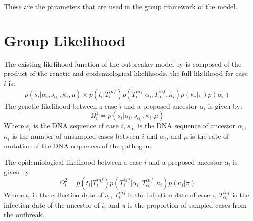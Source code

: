 \documentclass[11pt,a4paper]{report}
\begin{document}
These are the parameters that are used in the group framework of the model.

\section{Group Likelihood}
The existing likelihood function of the outbreaker model by \citet{outbrkr} is composed of the product of the genetic and epidemiological likelihoods, the full likelihood for case $i$ is:
\begin{equation}
p(s_i | \alpha_i , s_{\alpha_i}, \kappa_i, \mu) \times p(t_i | T^{inf}_i)p(T^{inf}_i | \alpha_i, T^{inf}_{\alpha_i}, \kappa_i)p(\kappa_i | \pi)p(\alpha_i)
\end{equation}
The genetic likelihood between a case $i$ and a proposed ancestor $\alpha_i$ is given by:
\begin{equation}
\Omega^{1}_i = p(s_i | \alpha_i , s_{\alpha_i}, \kappa_i, \mu)
\end{equation}
Where $s_i$ is the DNA sequence of case $i$, $s_{\alpha_i}$ is the DNA sequence of ancestor $\alpha_i$, $\kappa_i$ is the number of unsampled cases between $i$ and $\alpha_i$, and $\mu$ is the rate of mutation of the DNA sequences of the pathogen.

The epidemiological likelihood between a case $i$ and a proposed ancestor $\alpha_i$ is given by:
\begin{equation}
\Omega^{2}_i = p(t_i | T^{inf}_i)p(T^{inf}_i | \alpha_i, T^{inf}_{\alpha_i}, \kappa_i)p(\kappa_i | \pi)
\end{equation}
Where $t_i$ is the collection date of $s_i$, $T^{inf}_i$ is the infection date of case $i$, $T^{inf}_{\alpha_i}$ is the infection date of the ancestor of $i$, and $\pi$ is the proportion of sampled cases from the outbreak.
\end{document}
